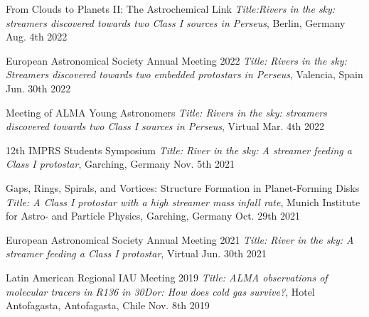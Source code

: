 \begin{cvhonors}
	 \cvhonor
	{From Clouds to Planets II: The Astrochemical Link} %
	{\textit{Title:Rivers in the sky: streamers discovered towards two Class I sources in Perseus}, Berlin, Germany} %
	{} %
	{Aug. 4th 2022} %


	\cvhonor
	{European Astronomical Society Annual Meeting 2022} %
	{\textit{Title: Rivers in the sky: Streamers discovered towards two embedded protostars in Perseus}, Valencia, Spain} %
	{} %
	{Jun. 30th 2022} %

  \cvhonor
    {Meeting of ALMA Young Astronomers} %
    {\textit{Title: Rivers in the sky: streamers discovered towards two Class I sources in Perseus}, Virtual} %
    {} %
    {Mar. 4th 2022} %

 
  \cvhonor
    {12th IMPRS Students Symposium} %
    {\textit{Title: River in the sky: A streamer feeding a Class I protostar}, Garching, Germany}%
    {} %
    {Nov. 5th 2021} %

  \cvhonor
    {Gaps, Rings, Spirals, and Vortices: Structure Formation in Planet-Forming Disks} %
    {\textit{Title: A Class I protostar with a high streamer mass infall rate}, Munich Institute for Astro- and Particle Physics, Garching, Germany} %
    {} %
    {Oct. 29th 2021} %

  \cvhonor
    {European Astronomical Society Annual Meeting 2021} %
    {\textit{Title: River in the sky: A streamer feeding a Class I protostar}, Virtual} %
    {} %
    {Jun. 30th 2021} %

  \cvhonor
    {Latin American Regional IAU Meeting 2019} %
    {\textit{Title: ALMA observations of molecular tracers in R136 in 30Dor: How does cold gas survive?}, Hotel Antofagasta, Antofagasta, Chile} %
    {} %
    {Nov. 8th 2019} %

\end{cvhonors}

